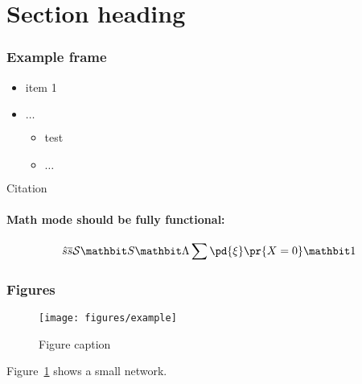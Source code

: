 \section{Section heading}

\begin{frame}
	\frametitle{Example frame}
	\begin{itemize}
		\item item 1
		\item $\ldots$
		\begin{itemize}
			\item test
			\item $\ldots$
		\end{itemize}
	\end{itemize}
	Citation \cite{rfc959}

	\paragraph{Math mode should be fully functional:}
	$$
	\hat s
	\overline s
	\mathcal S
	\mathbit S
	\mathbit \Lambda
	\sum
	\pd{\xi}
	\pr{X=0}
	\mathbit 1
	$$
\end{frame}

\begin{frame}
	\frametitle{Figures}
	\begin{figure}
		\centering
		\texttt{[image: figures/example]}
		\caption{Figure caption}
		\label{Maizaso0}
	\end{figure}
	Figure~\ref{Maizaso0} shows a small network.
\end{frame}
